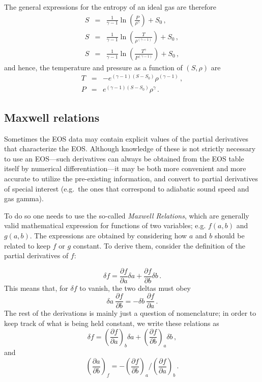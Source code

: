 \documentclass[paper=a4,fontsize=11pt]{scrartcl}
\numberwithin{equation}{section}		%
\numberwithin{figure}{section}			%
\numberwithin{table}{section}				%
\begin{document}
\noindent
The general expressions for the entropy of an ideal gas are therefore
\begin{eqnarray}
    S &=& \frac{1}{\gamma-1}\ln\left(\frac{P}{\rho^\gamma}\right) + S_0 \,,\\
    S &=& \frac{1}{\gamma-1}\ln\left(\frac{T}{\rho^{(\gamma-1)}}\right) + S_0 \,,\\
    S &=& \frac{1}{\gamma-1}\ln\left(\frac{T^{\gamma}}{P^{(\gamma-1)}}\right) + S_0 \,,
\end{eqnarray}
and hence, the temperature and pressure as a function of $(S,\rho)$ are
\begin{eqnarray}
    T &=& -e^{(\gamma-1)(S-S_0)} \rho^{(\gamma-1)}  \,,\\
    P &=& e^{(\gamma-1)(S-S_0)} \rho^{\gamma}\,.
\end{eqnarray}


\subsection{Maxwell relations}
Sometimes the EOS data may contain explicit values of the partial derivatives that characterize the EOS.  Although knowledge of these is not strictly necessary to use an EOS---such derivatives can always be obtained from the EOS table itself by numerical differentiation---it may be both more convenient and more accurate to utilize the pre-existing information, and convert to partial derivatives of special interest (e.g.\ the ones that correspond to adiabatic sound speed and gas gamma).

To do so one needs to use the so-called \textit{Maxwell Relations}, which are generally valid mathematical expression for functions of two variables; e.g. $f(a,b)$ and $g(a,b)$.  The expressions are obtained by considering how $a$ and $b$ should be related to keep $f$ or $g$ constant.  To derive them, consider the definition of the partial derivatives of $f$:

\begin{equation}
\delta f 
= \frac{\partial f}{\partial a} \delta a
+ \frac{\partial f}{\partial b} \delta b \,.
\end{equation}
This means that, for $\delta f$ to vanish, the two deltas must obey
\begin{equation}
\delta a ~ \frac{\partial f}{\partial b} 
= - \delta b ~ \frac{\partial f}{\partial a} \,.
\end{equation}
The rest of the derivations is mainly just a question of nomenclature; in order to keep track of what is being held constant, we write these relations as
\begin{equation}
\delta f 
= \left(\frac{\partial f}{\partial a}\right)_{b} \delta a
+ \left(\frac{\partial f}{\partial b}\right)_{a} \delta b \,,
\end{equation}
and
\begin{equation}
\left(\frac{\partial a}{\partial b}\right)_{f} =
- \left(\frac{\partial f}{\partial b}\right)_{a}
/ \left(\frac{\partial f}{\partial a}\right)_{b} \,.
\end{equation}
\end{document}
